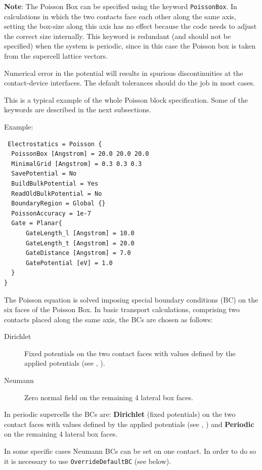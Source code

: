 {\bf Note}: The Poisson Box can be specified using the keyword
\verb|PoissonBox|. In calculations in which the two contacts face each other
along the same axis, setting the box-size along this axis has no effect because
the code needs to adjust the correct size internally.  This keyword is redundant
(and should not be specified) when the system is periodic, since in this case
the Poisson box is taken from the supercell lattice vectors.

Numerical error in the potential will results in spurious discontinuities at the
contact-device interfaces. The default tolerances should do the job in most
cases.

This is a typical example of the whole Poisson block specification. Some of the
keywords are described in the next subsections.

Example:

\begin{verbatim}
 Electrostatics = Poisson {
  PoissonBox [Angstrom] = 20.0 20.0 20.0
  MinimalGrid [Angstrom] = 0.3 0.3 0.3
  SavePotential = No
  BuildBulkPotential = Yes
  ReadOldBulkPotential = No
  BoundaryRegion = Global {}
  PoissonAccuracy = 1e-7
  Gate = Planar{
      GateLength_l [Angstrom] = 10.0
      GateLength_t [Angstrom] = 20.0
      GateDistance [Angstrom] = 7.0
      GatePotential [eV] = 1.0
  }
}
\end{verbatim}


The Poisson equation is solved imposing special boundary conditions (BC) on the
six faces of the Poisson Box. In basic transport calculations, comprising two
contacts placed along the same axis, the BCs are chosen as follows:

\begin{description}
\item[Dirichlet] Fixed potentials on the two contact faces with values defined
  by the applied potentials (see , ).
\item[Neumann] Zero normal field on the remaining 4 lateral box faces.
\end{description}
In periodic supercells the BCs are: {\bf Dirichlet} (fixed potentials) on the
two contact faces with values defined by the applied potentials (see
, ) and {\bf Periodic} on the remaining
4 lateral box faces.

In some specific cases Neumann BCs can be set on one contact. In order to do so
it is necessary to use \verb|OverrideDefaultBC| (see below).

